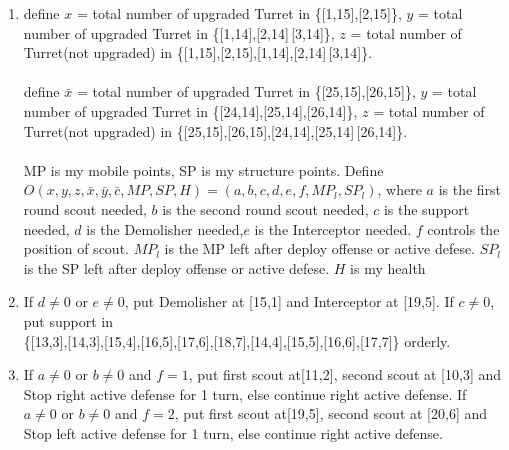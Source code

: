 \documentclass[12pt]{article}
\begin{document}
\begin{enumerate}
\begin{enumerate}
\item define $x$ = total number of upgraded Turret in \{[1,15],[2,15]\}, $y$ = total number of upgraded Turret in \{[1,14],[2,14]\,[3,14]\}, $z$ = total number of Turret(not upgraded) in  \{[1,15],[2,15],[1,14],[2,14]\,[3,14]\}.\\\\define $\bar{x}$ = total number of upgraded Turret in \{[25,15],[26,15]\}, $y$ = total number of upgraded Turret in \{[24,14],[25,14],[26,14]\}, $z$ = total number of Turret(not upgraded) in  \{[25,15],[26,15],[24,14],[25,14]\,[26,14]\}.\\ \\MP is my mobile points, SP is my structure points. Define\\ $O(x,y,z,\bar{x},\bar{y},\bar{c},MP,SP,H) = (a,b,c,d,e,f,MP_l,SP_l)$, where $a$ is the first round scout needed, $b$ is the second round scout needed, $c$ is the support needed, $d$ is the Demolisher needed,$e$ is the Interceptor needed. $f$ controls the position of scout. $MP_l$ is the MP left after deploy offense or active defese. $SP_l$ is the SP left after deploy offense or active defese. $H$ is my health
\item If $d \neq 0$ or $e \neq 0$, put Demolisher at  [15,1] and Interceptor at [19,5]. If $c \neq 0$, put support in\\ \{[13,3],[14,3],[15,4],[16,5],[17,6],[18,7],[14,4],[15,5],[16,6],[17,7]\} orderly.
\item If $a \neq 0$ or $b \neq 0$ and $f =1$, put first scout at[11,2], second scout at [10,3] and Stop right active defense for 1 turn, else continue right active defense. If $a \neq 0$ or $b \neq 0$ and $f =2$, put first scout at[19,5], second scout at [20,6] and Stop left active defense for 1 turn, else continue right active defense.
\end{enumerate}
\end{enumerate}
\end{document}
